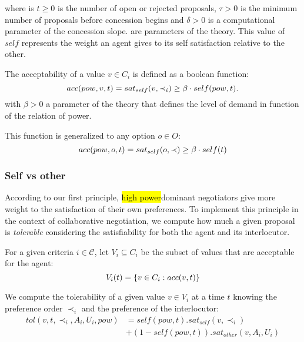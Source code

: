 \documentclass{llncs}
\begin{document}
	 where is $t \geq 0$ is the number of open or rejected proposals, $\tau > 0$ is the minimum number of proposals before concession begins and $\delta > 0$ is a computational parameter of the concession slope.
	 are parameters of the theory. This value of $self$ represents the weight an agent gives to its self satisfaction relative to the other.
	 
	 The acceptability of a value $v \in C_i$ is defined as a boolean function:
	 	 	\vspace{-.5em} 
	 \begin{equation}
	 \vspace{-.5em} 
	 acc(pow,v, t) = sat_{self}(v, \prec_i) \geq  \beta \cdot self(pow,t).
	 \end{equation}
	 with $\beta>0$ a parameter of the theory that defines the level of demand in function of the relation of power.
	 
	 This function is generalized to any option $o \in O$:
	 	\vspace{-.5em} 
	 \begin{equation}
	 acc(pow,o, t) = sat_{self}(o, \prec) \geq  \beta \cdot self(t)
	 	\vspace{-1.5em} 
	 \end{equation}

	\subsubsection {Self vs other}
	According to our first principle, \hl{high power}dominant negotiators give more weight to the satisfaction of their own preferences. To implement this principle in the context of collaborative negotiation, we compute how much a given proposal is \emph{tolerable} considering the satisfiability for both the agent and its interlocutor.
	
	For a given criteria $i\in\mathcal{C}$, let $V_i\subseteq C_i$ be the subset of values that are acceptable for the agent:
	\vspace{-1em} 
	\begin{equation}
	V_i(t) = \{ v\in C_i : acc(v,t) \}
		\vspace{-0.5em} 
	\end{equation}
	
	We compute the tolerability of a given value $v\in V_i$ at a time $t$ knowing the preference order $\prec_i$ and the preference of the interlocutor:
		\vspace{-1em} 
	\begin{equation}
	\begin{split}
	tol(v, t, \prec_i, A_i, U_i, pow) & = self(pow, t) . sat_{self}(v, \prec_i) \\
	& +  (1 - self(pow, t)) . sat_{other}(v, A_i, U_i)
	\end{split} 
	\end{equation}
	
\end{document}
